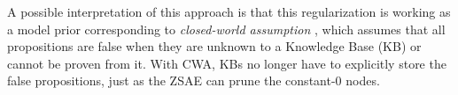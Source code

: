 


A possible interpretation of this approach 
is that
this regularization is working as a model prior corresponding to \emph{closed-world assumption} \cite[CWA]{reiter1981closed},
which assumes that all propositions are false
when they are unknown to a Knowledge Base (KB) or cannot be proven from it.
With CWA, KBs no longer have to explicitly store the false propositions,
just as the ZSAE can prune the constant-0 nodes.
% 
